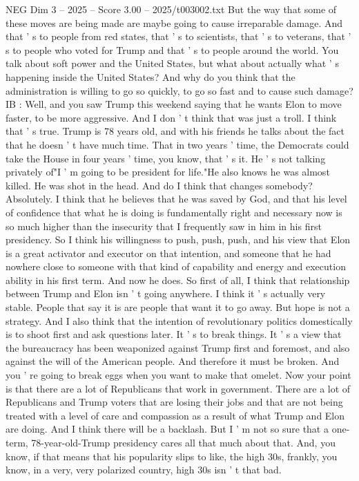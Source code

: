 \begin{textsample}{NEG Dim 3 – 2025 – Score 3.00 – 2025/t003002.txt}
But the way that some of these moves are being made are maybe going to cause irreparable damage.
And that ' s to people from red states, that ' s to scientists, that ' s to veterans, that ' s to people who voted for Trump and that ' s to people around the world.
You talk about soft power and the United States, but what about actually what ' s happening inside the United States?
And why do you think that the administration is willing to go so quickly, to go so fast and to cause such damage?
IB : Well, and you saw Trump this weekend saying that he wants Elon to move faster, to be more aggressive.
And I don ' t think that was just a troll.
I think that ' s true.
Trump is 78 years old, and with his friends he talks about the fact that he doesn ' t have much time.
That in two years ' time, the Democrats could take the House in four years ' time, you know, that ' s it.
He ' s not talking privately of"I ' m going to be president for life."He also knows he was almost killed.
He was shot in the head.
And do I think that changes somebody?
Absolutely.
I think that he believes that he was saved by God, and that his level of confidence that what he is doing is fundamentally right and necessary now is so much higher than the insecurity that I frequently saw in him in his first presidency.
So I think his willingness to push, push, push, and his view that Elon is a great activator and executor on that intention, and someone that he had nowhere close to someone with that kind of capability and energy and execution ability in his first term.
And now he does.
So first of all, I think that relationship between Trump and Elon isn ' t going anywhere.
I think it ' s actually very stable.
People that say it is are people that want it to go away.
But hope is not a strategy.
And I also think that the intention of revolutionary politics domestically is to shoot first and ask questions later.
It ' s to break things.
It ' s a view that the bureaucracy has been weaponized against Trump first and foremost, and also against the will of the American people.
And therefore it must be broken.
And you ' re going to break eggs when you want to make that omelet.
Now your point is that there are a lot of Republicans that work in government.
There are a lot of Republicans and Trump voters that are losing their jobs and that are not being treated with a level of care and compassion as a result of what Trump and Elon are doing.
And I think there will be a backlash.
But I ' m not so sure that a one-term, 78-year-old-Trump presidency cares all that much about that.
And, you know, if that means that his popularity slips to like, the high 30s, frankly, you know, in a very, very polarized country, high 30s isn ' t that bad.

\end{textsample}
